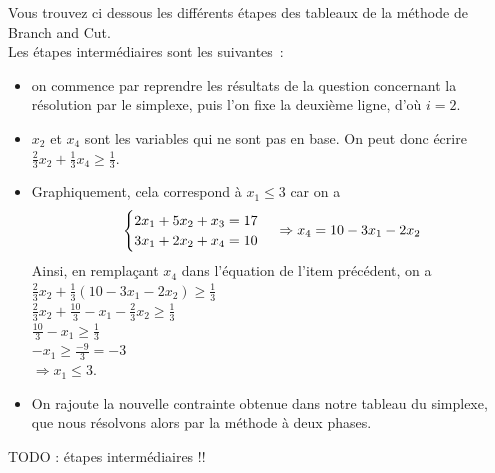 \documentclass[a4paper, 12pt]{article}
\begin{document}
Vous trouvez ci dessous les différents étapes des tableaux de la
méthode de Branch and Cut. \\
Les étapes intermédiaires sont les suivantes~:
\begin{itemize}
\item on commence par reprendre les résultats de la question
  concernant la résolution par le simplexe, puis l'on fixe la deuxième
  ligne, d'où $i = 2$.
\item $x_2$ et $x_4$ sont les variables qui ne sont pas en base. On
  peut donc écrire $\frac{2}{3} x_2 + \frac{1}{3} x_4 \geq
  \frac{1}{3}$.
\item Graphiquement, cela correspond à $x_1 \leq 3$ car on a 
\begin{equation}
\begin{cases}
2x_1 + 5x_2 + x_3  = 17 \\
3x_1 + 2x_2 + x_4  = 10 \\
\end{cases}
\\
\Rightarrow x_4  = 10 - 3x_1 - 2x_2 
\end{equation}
Ainsi, en remplaçant $x_4$ dans l'équation de l'item précédent, on a
\\
$\frac{2}{3}x_2 + \frac{1}{3}(10-3x_1-2x_2) \geq \frac{1}{3}$ \\
$\frac{2}{3}x_2 + \frac{10}{3} - x_1 - \frac{2}{3}x_2 \geq
\frac{1}{3}$ \\
$\frac{10}{3} - x_1 \geq \frac{1}{3}$ \\
$-x_1 \geq \frac{-9}{3} = -3$ \\
$\Rightarrow x_1 \leq 3$.
\item On rajoute la nouvelle contrainte obtenue dans notre tableau du
  simplexe, que nous résolvons alors par la méthode à deux phases.
\end{itemize}

TODO : étapes intermédiaires !!
\end{document}
